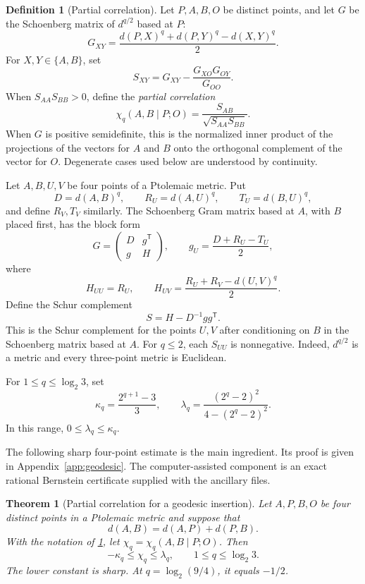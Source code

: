 \documentclass[11pt]{amsart}
\newtheorem{theorem}{Theorem}[section]
\theoremstyle{definition}
\newtheorem{definition}[definition]{Definition}
\theoremstyle{remark}
\begin{document}
\begin{definition}[Partial correlation]\label{def:section-correlation}
Let $P,A,B,O$ be distinct points, and let $G$ be the Schoenberg matrix of
$d^{q/2}$ based at $P$:
\[
 G_{XY}=\frac{d(P,X)^q+d(P,Y)^q-d(X,Y)^q}{2}.
\]
For $X,Y\in\{A,B\}$, set
\[
 S_{XY}=G_{XY}-\frac{G_{XO}G_{OY}}{G_{OO}}.
\]
When $S_{AA}S_{BB}>0$, define the \emph{partial correlation}
\begin{equation}\label{eq:section-correlation-definition}
 \chi_q(A,B\mid P;O)
 =\frac{S_{AB}}{\sqrt{S_{AA}S_{BB}}}.
\end{equation}
When $G$ is positive semidefinite, this is the normalized inner product
of the projections of the vectors for $A$ and $B$ onto the orthogonal
complement of the vector for $O$. Degenerate cases used below are
understood by continuity.
\end{definition}

Let $A,B,U,V$ be four points of a Ptolemaic metric. Put
\[
 D=d(A,B)^q,
 \qquad
 R_U=d(A,U)^q,
 \qquad
 T_U=d(B,U)^q,
\]
and define $R_V,T_V$ similarly. The Schoenberg Gram matrix based at $A$, with $B$ placed first, has the block form
\[
 G=
 \begin{pmatrix}
  D&g^{\mathsf T}\\
  g&H
 \end{pmatrix},
 \qquad
 g_U=\frac{D+R_U-T_U}{2},
\]
where
\[
 H_{UU}=R_U,
 \qquad
 H_{UV}=\frac{R_U+R_V-d(U,V)^q}{2}.
\]
Define the Schur complement
\begin{equation}\label{eq:transverse}
 S=H-D^{-1}gg^{\mathsf T}.
\end{equation}
This is the Schur complement for the points $U,V$ after conditioning on
$B$ in the Schoenberg matrix based at $A$. For $q\le2$, each $S_{UU}$ is
nonnegative. Indeed,
$d^{q/2}$ is a metric and every three-point metric is Euclidean.

For $1\le q\le\log_2 3$, set
\begin{equation}\label{eq:kappa-lambda}
 \kappa_q=\frac{2^{q+1}-3}{3},
 \qquad
 \lambda_q=\frac{(2^q-2)^2}{4-(2^q-2)^2}.
\end{equation}
In this range, $0\le\lambda_q\le\kappa_q$.

The following sharp four-point estimate is the main ingredient. Its proof
is given in Appendix~\ref{app:geodesic}. The computer-assisted component is
an exact rational Bernstein certificate supplied with the ancillary files.

\begin{theorem}[Partial correlation for a geodesic insertion]\label{thm:geodesic-section}
Let $A,P,B,O$ be four distinct points in a Ptolemaic metric and
suppose that
\[
 d(A,B)=d(A,P)+d(P,B).
\]
With the notation of \cref{def:section-correlation}, let
$\chi_q=\chi_q(A,B\mid P;O)$. Then
\begin{equation}\label{eq:geodesic-section-bound}
 -\kappa_q\le\chi_q\le\lambda_q,
 \qquad
 1\le q\le\log_2 3.
\end{equation}
The lower constant is sharp. At $q=\log_2(9/4)$, it equals $-1/2$.
\end{theorem}
\end{document}
